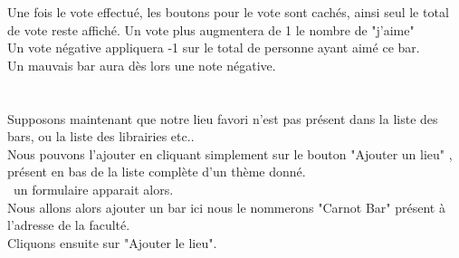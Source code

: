 \documentclass[10pt,a4paper, landscape]{report}
\begin{document}
{{{{{{\newpage
Une fois le vote effectué, les boutons pour le vote sont cachés, ainsi seul le total de vote reste affiché.
Un vote plus augmentera de 1 le nombre de "j'aime" \\
Un vote négative appliquera -1 sur le total de personne ayant aimé ce bar. \\

Un mauvais bar aura dès lors une note négative. \\
{%
\setlength{\fboxsep}{0pt}%
\setlength{\fboxrule}{2pt}%
%

\newpage
\section{}

Supposons maintenant que notre lieu favori n'est pas présent dans la liste des bars, ou la liste des librairies etc.. \\
Nous pouvons l'ajouter en cliquant simplement sur le bouton "Ajouter un lieu" , présent en bas de la liste complète d'un thème donné. \\\
un formulaire apparait alors. \\

Nous allons alors ajouter un bar ici nous le nommerons "Carnot Bar" présent à l'adresse de la faculté. \\
Cliquons ensuite sur "Ajouter le lieu".
{%
\setlength{\fboxsep}{0pt}%
\setlength{\fboxrule}{2pt}%
%

}}}}}}}}
\end{document}
